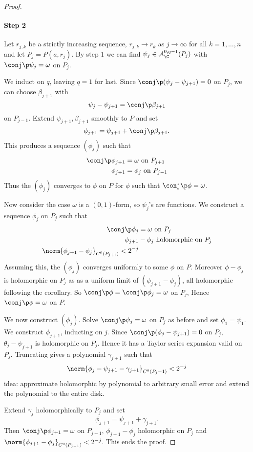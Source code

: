 \documentclass[a4paper]{article}
\begin{document}
\begin{proof}
  \paragraph{Step 2}
  Let \(r_{j, k}\) be a strictly increasing sequence, \(r_{j, k} \to r_k\) as \(j \to \infty\) for all \(k = 1, \dots, n\) and let \(P_j = P(a, r_j)\). By step 1 we can find \(\psi_j \in \mathcal A_\C^{0, q - 1}(P_j)\) with \(\conj \p \psi_j = \omega\) on \(P_j\).

  We induct on \(q\), leaving \(q = 1\) for last. Since \(\conj \p(\psi_j - \psi_{j + 1}) = 0\) on \(P_j\), we can choose \(\beta_{j + 1}\) with
  \[
    \psi_j - \psi_{j + 1} = \conj \p \beta_{j + 1}
  \]
  on \(P_{j - 1}\). Extend \(\psi_{j + 1}, \beta_{j + 1}\) smoothly to \(P\) and set
  \[
    \phi_{j + 1} = \psi_{j + 1} + \conj \p \beta_{j + 1}.
  \]
  This produces a sequence \((\phi_j)\) such that
  \begin{align*}
    \conj \p \phi_{j + 1} &= \omega \text{ on } P_{j + 1} \\
    \phi_{j + 1} &= \phi_j \text{ on } P_{j - 1}
  \end{align*}
  Thus the \((\phi_j)\) converges to \(\phi\) on \(P\) for \(\phi\) such that \(\conj \p \phi = \omega\).

  Now consider the case \(\omega\) is a \((0, 1)\)-form, so \(\psi_j\)'s are functions. We construct a sequence \(\phi_j\) on \(P_j\) such that
  \begin{align*}
    \conj \p \phi_j &= \omega \text{ on } P_j \\
    \phi_{j + 1} &- \phi_j \text{ holomorphic on } P_j \\
    \norm{\phi_{j + 1} - \phi_j}_{C^0(P_{j + 1})} < 2^{-j}
  \end{align*}
  Assuming this, the \((\phi_j)\) converges uniformly to some \(\phi\) on \(P\). Moreover \(\phi - \phi_j\) is holomorphic on \(P_j\) as as a uniform limit of \((\phi_{j + 1} - \phi_j)\), all holomorphic following the corollary. So \(\conj \p \phi = \conj \p \phi_j = \omega\) on \(P_j\), Hence \(\conj \p \phi = \omega\) on \(P\).

  We now construct \((\phi_j)\). Solve \(\conj \p \psi_j = \omega\) on \(P_j\) as before and set \(\phi_1 = \psi_1\). We construct \(\phi_{j + 1}\), inducting on \(j\). Since \(\conj \p(\phi_j - \psi_{j + 1}) = 0\) on \(P_j\), \(\theta_j - \psi_{j + 1}\) is holomorphic on \(P_j\). Hence it has a Taylor series expansion valid on \(P_j\). Truncating gives a polynomial \(\gamma_{j + 1}\) such that
  \[
    \norm{\phi_j - \psi_{j + 1} - \gamma_{j + 1}}_{C^0(P_j - 1)} < 2^{-j}
  \]
  idea: approximate holomorphic by polynomial to arbitrary small error and extend the polynomial to the entire disk.

  Extend \(\gamma_j\) holomorphically to \(P_j\) and set
  \[
    \phi_{j + 1} = \psi_{j + 1} + \gamma_{j + 1}.
  \]
  Then \(\conj \p \phi_{j + 1} = \omega\) on \(P_{j + 1}\), \(\phi_{j + 1} - \phi_j\) holomorphic on \(P_j\) and \(\norm{\phi_{j + 1} - \phi_j}_{C^0(P_{j - 1})} < 2^{-j}\). This ends the proof.
\end{proof}
\end{document}
